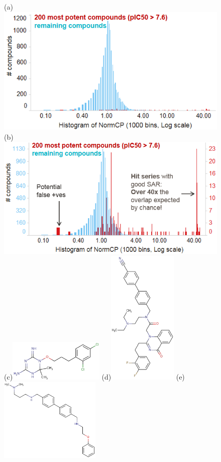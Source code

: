 \documentclass[journal=jacsat,biochem,manuscript=article]{achemso}
\begin{document}
\begin{figure}
  (a)\includegraphics[width=4.5in]{fig/NormCP_all.png}\\
  (b)\includegraphics[width=4.5in]{fig/NormCP_top200.png}\\
  (c)\includegraphics[width=1.8in]{fig/NormCP=42_5_pIC50=8_49_CID524739_v2.png}
  (d)\includegraphics[width=1.3in]{fig/NormCP=0_17_pIC50=8_22_CID541941_v2.png}
  (e)\includegraphics[width=1.9in]{fig/NormCP=0_16_pIC50=7_73_CID531249_v2.png}  

\end{figure}
\end{document}
